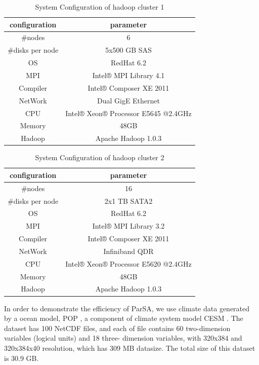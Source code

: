 \documentclass[preprint,12pt]{elsarticle}
\begin{document}
\begin{table}[ht]
\caption{System Configuration of hadoop cluster 1} 
\centering 
\begin{tabular}{c c}
\hline
configuration & parameter \\
\hline 
\#nodes & 6 \\ 
\#disks per node & 5x500 GB SAS \\
OS & RedHat 6.2 \\
MPI & Intel® MPI Library 4.1 \\
Compiler & Intel® Composer XE 2011 \\
NetWork & Dual GigE Ethernet \\
CPU & Intel® Xeon® Processor E5645 @2.4GHz \\
Memory & 48GB \\
Hadoop & Apache Hadoop 1.0.3 \\
\hline 
\end{tabular}
\label{table2} 
\end{table}

\begin{table}[ht]
\caption{System Configuration of hadoop cluster 2} 
\centering 
\begin{tabular}{c c}
\hline
configuration & parameter \\
\hline 
\#nodes & 16 \\ 
\#disks per node & 2x1 TB SATA2 \\
OS & RedHat 6.2 \\
MPI & Intel® MPI Library 3.2 \\
Compiler & Intel® Composer XE 2011 \\
NetWork & Infiniband QDR \\
CPU & Intel® Xeon® Processor E5620 @2.4GHz \\
Memory & 48GB \\
Hadoop & Apache Hadoop 1.0.3 \\
\hline 
\end{tabular}
\label{table1} 
\end{table}

In order to demonstrate the efficiency of ParSA, we use climate data generated by a ocean model, POP \cite{pop}, a component of climate system 
model CESM \cite{cesm}. The dataset has 100 NetCDF files, and each of file contains 60 two-dimension variables (logical units) and 18 three-
dimension variables, with 320x384 and 320x384x40 resolution, which has 309 MB datasize. The total size of this dataset is 30.9 GB. \par 
\end{document}

